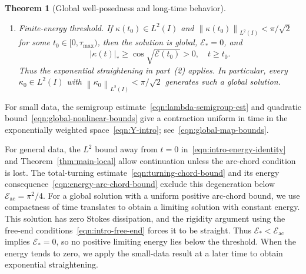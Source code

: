 \documentclass[11pt,reqno]{amsart}
\theoremstyle{plain}
\newtheorem{theorem}{Theorem}[section]
\theoremstyle{definition}
\numberwithin{equation}{section}
\newcommand{\mc}[1]{\mathcal{#1}}
\newcommand{\abs}[1]{\left\lvert #1 \right\rvert}
\newcommand{\norm}[1]{\left\lVert #1 \right\rVert}
\begin{document}
\begin{theorem}[Global well-posedness and long-time behavior]
\begin{enumerate}
\begin{enumerate}
        \item If $\mc E_*>0$, then $\mc E_*\ge\mc E_{\mathrm{ac}}$ and
        \begin{equation*}
            \liminf_{t\to\infty}\abs{\kappa(t)}_*=0.
        \end{equation*}
    \end{enumerate}

    \item \emph{Finite-energy threshold.}
    If $\kappa(t_0)\in L^2(I)$ and
    $\norm{\kappa(t_0)}_{L^2(I)}<\pi/\sqrt2$ for some
    $t_0\in[0,\tau_{\mathrm{max}})$, then the solution is global,
    $\mc E_*=0$, and
    \begin{equation}\label{eqn:main-post-threshold-arc-chord}
        \abs{\kappa(t)}_*
        \ge\cos\sqrt{\mc E(t_0)}>0,
        \quad t\ge t_0.
    \end{equation}
    Thus the exponential straightening in part~\emph{(2)} applies.
    In particular, every $\kappa_0\in L^2(I)$ with
    $\norm{\kappa_0}_{L^2(I)}<\pi/\sqrt2$ generates such a global solution.
\end{enumerate}
\end{theorem}

For small data, the semigroup estimate~\eqref{eqn:lambda-semigroup-est}
and quadratic bound~\eqref{eqn:global-nonlinear-bounds} give a contraction
uniform in time in the exponentially weighted space~\eqref{eqn:Y-intro};
see~\eqref{eqn:global-map-bounds}.

For general data, the $L^2$ bound away from $t=0$
in~\eqref{eqn:intro-energy-identity} and Theorem~\ref{thm:main-local} allow continuation unless the arc-chord
condition is lost. The total-turning estimate~\eqref{eqn:turning-chord-bound}
and its energy consequence~\eqref{eqn:energy-arc-chord-bound} exclude
this degeneration below $\mc E_{\mathrm{ac}}=\pi^2/4$.
For a global solution with a uniform positive arc-chord bound, we use
compactness of time translates to obtain a limiting solution with constant
energy. This solution has zero Stokes dissipation, and the rigidity argument
using the free-end conditions~\eqref{eqn:intro-free-end} forces it to be
straight. Thus $\mc E_*<\mc E_{\mathrm{ac}}$ implies
$\mc E_*=0$, so no positive limiting energy lies below the threshold.
When the energy tends to zero, we apply the small-data result at a later
time to obtain exponential straightening.
\end{document}
